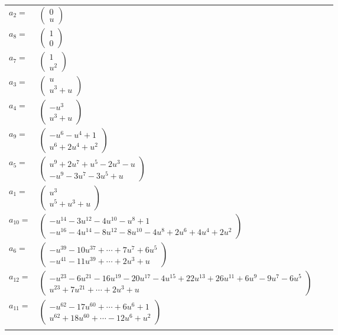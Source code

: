 \documentclass[1p]{elsarticle_modified}
\theoremstyle{definition}
\begin{document}
\begin{tabular}{m{7pt} m{180pt} m{7pt} m{180pt} }
\flushright $a_{2}=$&$\begin{pmatrix}0\\u\end{pmatrix}$ \\
\flushright $a_{8}=$&$\begin{pmatrix}1\\0\end{pmatrix}$ \\
\flushright $a_{7}=$&$\begin{pmatrix}1\\u^2\end{pmatrix}$ \\
\flushright $a_{3}=$&$\begin{pmatrix}u\\u^3+u\end{pmatrix}$ \\
\flushright $a_{4}=$&$\begin{pmatrix}- u^3\\u^3+u\end{pmatrix}$ \\
\flushright $a_{9}=$&$\begin{pmatrix}- u^6- u^4+1\\u^6+2 u^4+u^2\end{pmatrix}$ \\
\flushright $a_{5}=$&$\begin{pmatrix}u^9+2 u^7+u^5-2 u^3- u\\- u^9-3 u^7-3 u^5+u\end{pmatrix}$ \\
\flushright $a_{1}=$&$\begin{pmatrix}u^3\\u^5+u^3+u\end{pmatrix}$ \\
\flushright $a_{10}=$&$\begin{pmatrix}- u^{14}-3 u^{12}-4 u^{10}- u^8+1\\- u^{16}-4 u^{14}-8 u^{12}-8 u^{10}-4 u^8+2 u^6+4 u^4+2 u^2\end{pmatrix}$ \\
\flushright $a_{6}=$&$\begin{pmatrix}- u^{39}-10 u^{37}+\cdots+7 u^7+6 u^5\\- u^{41}-11 u^{39}+\cdots+2 u^3+u\end{pmatrix}$ \\
\flushright $a_{12}=$&$\begin{pmatrix}- u^{23}-6 u^{21}-16 u^{19}-20 u^{17}-4 u^{15}+22 u^{13}+26 u^{11}+6 u^9-9 u^7-6 u^5\\u^{23}+7 u^{21}+\cdots+2 u^3+u\end{pmatrix}$ \\
\flushright $a_{11}=$&$\begin{pmatrix}- u^{62}-17 u^{60}+\cdots+6 u^6+1\\u^{62}+18 u^{60}+\cdots-12 u^6+u^2\end{pmatrix}$\\&\end{tabular}
\end{document}

